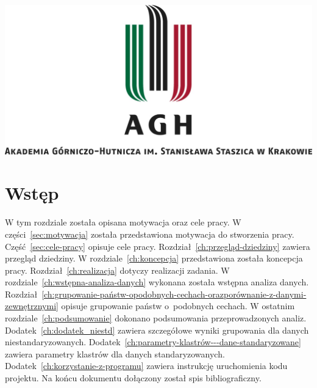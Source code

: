 \documentclass[11pt]{report}
\begin{document}
    \begin{titlepage}
        \centering
        \includegraphics[width=\linewidth]{fig/AGH.jpg}
        \vspace{0.03\textheight}
        \bigskip
        \vspace{0.2\textheight}
        \par

        \vspace{0.1\textheight}
    \end{titlepage}

    \tableofcontents


    \chapter{Wstęp}

    W tym rozdziale została opisana motywacja oraz cele pracy.
    W części~\ref{sec:motywacja} została przedstawiona motywacja do stworzenia pracy.
    Część~\ref{sec:cele-pracy} opisuje cele pracy.
    Rozdział~\ref{ch:przegląd-dziedziny} zawiera przegląd dziedziny.
    W rozdziale~\ref{ch:koncepcja} przedstawiona została koncepcja pracy.
    Rozdział~\ref{ch:realizacja} dotyczy realizacji zadania.
    W rozdziale~\ref{ch:wstępna-analiza-danych} wykonana została wstępna analiza danych.
    Rozdział~\ref{ch:grupowanie-państw-opodobnych-cechach-orazporównanie-z-danymi-zewnętrznymi} opisuje grupowanie państw o~podobnych cechach.
    W ostatnim rozdziale~\ref{ch:podsumowanie} dokonano podsumowania przeprowadzonych analiz.
    Dodatek~\ref{ch:dodatek_niestd} zawiera szczegółowe wyniki grupowania dla danych niestandaryzowanych.
    Dodatek~\ref{ch:parametry-klastrów---dane-standaryzowane} zawiera parametry klastrów dla danych standaryzowanych.
    Dodatek~\ref{ch:korzystanie-z-programu} zawiera instrukcję uruchomienia kodu projektu.
    Na końcu dokumentu dołączony został spis bibliograficzny.
\end{document}
